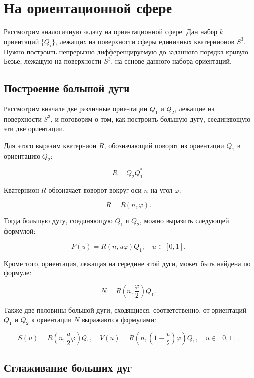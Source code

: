 \section{На ориентационной сфере}

Рассмотрим аналогичную задачу на ориентационной сфере. Дан набор $k$ ориентаций $\{Q_i\}$, лежащих на поверхности сферы
единичных кватернионов $S^3$. Нужно построить непрерывно-дифференцируемую до заданного порядка кривую Безье, лежащую
на поверхности $S^3$, на основе данного набора ориентаций.

\subsection*{Построение большой дуги}

Рассмотрим вначале две различные ориентации $Q_1$ и $Q_2$, лежащие на поверхности $S^3$, и поговорим о том, как
построить большую дугу, соединяющую эти две ориентации.

Для этого выразим кватернион $R$, обозначающий поворот из ориентации $Q_1$ в ориентацию $Q_2$:

$$
R=Q_2Q_1^*.
$$

Кватернион $R$ обозначает поворот вокруг оси $n$ на угол $\varphi$:

$$
R=R(n,\varphi).
$$

Тогда большую дугу, соединяющую $Q_1$ и $Q_2$, можно выразить следующей формулой:

\begin{equation}
P(u)=R(n,u\varphi)Q_1, \quad u \in [0,1].
\label{orientation-big-arc}
\end{equation}

Кроме того, ориентация, лежащая на середине этой дуги, может быть найдена по формуле:

\begin{equation}
N=R(n,\frac{\varphi}{2})Q_1.
\label{orientation-big-arc-mid}
\end{equation}

Также две половины большой дуги, сходящиеся, соответственно, от ориентаций $Q_1$ и $Q_2$ к ориентации $N$
выражаются формулами:

\begin{equation}
S(u)=R(n,\frac{u}{2}\varphi)Q_1, \quad V(u)=R(n,(1-\frac{u}{2})\varphi)Q_1, \quad u \in [0,1].
\label{orientation-big-arc-halfs}
\end{equation}

\subsection*{Сглаживание больших дуг}

